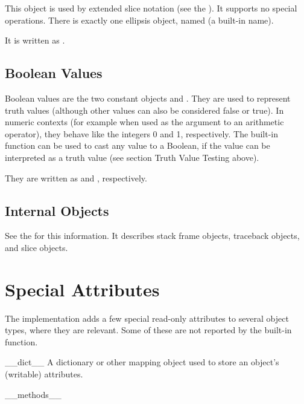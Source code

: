 This object is used by extended slice notation (see the
).  It supports no
special operations.  There is exactly one ellipsis object, named
 (a built-in name).

It is written as .

\subsection{Boolean Values}

Boolean values are the two constant objects  and
.  They are used to represent truth values (although other
values can also be considered false or true).  In numeric contexts
(for example when used as the argument to an arithmetic operator),
they behave like the integers 0 and 1, respectively.  The built-in
function  can be used to cast any value to a Boolean,
if the value can be interpreted as a truth value (see section Truth
Value Testing above).

They are written as  and , respectively.


\subsection{Internal Objects \label{typesinternal}}

See the  for this
information.  It describes stack frame objects, traceback objects, and
slice objects.


\section{Special Attributes \label{specialattrs}}

The implementation adds a few special read-only attributes to several
object types, where they are relevant.  Some of these are not reported
by the  built-in function.

\begin{memberdesc}[object]{__dict__}
A dictionary or other mapping object used to store an
object's (writable) attributes.
\end{memberdesc}

\begin{memberdesc}[object]{__methods__}
\end{memberdesc}


